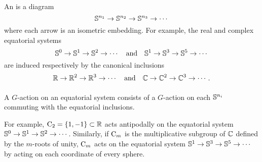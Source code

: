 

\subsubsection{}

An  is a diagram
\[
\mathbb{S}^{n_1} \to \mathbb{S}^{n_2} \to \mathbb{S}^{n_3} \to \dotsb
\]
where each arrow is an isometric embedding.
For example, the real and complex equatorial systems
\[
\mathbb{S}^0 \to \mathbb{S}^1 \to \mathbb{S}^2 \to \dotsb
\quad\text{and}\quad
\mathbb{S}^1 \to \mathbb{S}^3 \to \mathbb{S}^5 \to \dotsb
\]
are induced respectively by the canonical inclusions
\[
\mathbb{R} \to \mathbb{R}^2 \to \mathbb{R}^3 \to \dotsb
\quad\text{and}\quad
\mathbb{C} \to \mathbb{C}^2 \to \mathbb{C}^3 \to \dotsb.
\]

\subsubsection{}

A \(G\)-action on an equatorial system consists of a \(G\)-action on each \(\mathbb{S}^{n_i}\) commuting with the equatorial inclusions.

For example, \(\mathrm{C}_2 = \{1,-1\} \subset \mathbb{R}\) acts antipodally on the equatorial system \(\mathbb{S}^0 \to \mathbb{S}^1 \to \mathbb{S}^2 \to \dotsb\).
Similarly, if \(\mathrm{C}_m\) is the multiplicative subgroup of \(\mathbb{C}\) defined by the \(m\)-roots of unity, \(\mathrm{C}_m\) acts on the equatorial system \(\mathbb{S}^1 \to \mathbb{S}^3 \to \mathbb{S}^5 \to \dotsb\) by acting on each coordinate of every sphere.

